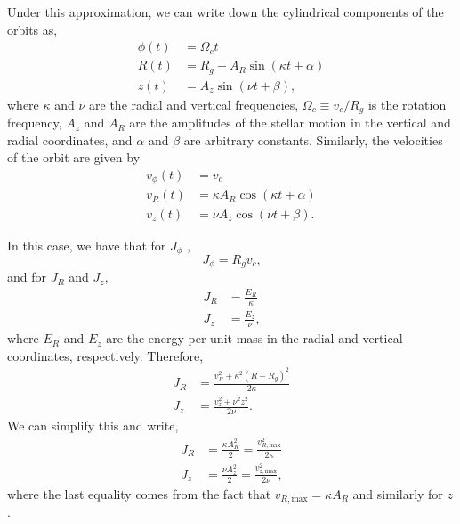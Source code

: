 \documentclass[twocolumn]{aastex62}
\newcommand{\beq}{\begin{equation}}
\newcommand{\eeq}{\end{equation}}
\begin{document}
Under this approximation, we can write down the cylindrical components
of the orbits as,
\beq\label{eq:orbits_epi}
\begin{split}
\phi(t) &= \Omega_c t \\
R(t) &= R_g + A_R \sin{(\kappa t + \alpha)} \\
z(t) &= A_z \sin{(\nu t + \beta)}
\text{,}
\end{split}
\eeq
where $\kappa$ and $\nu$ are the radial and vertical frequencies, $\Omega_c
\equiv v_c/R_g$ is the rotation frequency, $A_z$ and $A_R$ are the amplitudes of
the stellar motion in the vertical and radial coordinates, and $\alpha$ and
$\beta$ are arbitrary constants. Similarly, the velocities of the orbit are
given by
\beq\label{eq:orbits_vel_epi}
\begin{split}
v_{\phi}(t) &= v_c \\
v_R(t) &= \kappa A_R \cos{(\kappa t + \alpha)} \\
v_z(t) &= \nu A_z \cos{(\nu t + \beta)}
\text{.}
\end{split}
\eeq

In this case, we have that for $J_{\phi}$
\citep[][Section~3.5.3b]{2008gady.book.....B},
\beq\label{eq:Jphi_epi}
J_{\phi} = R_g v_c\text{,}
\eeq
and for $J_R$ and $J_z$,
\beq\label{eq:JR_Jz_epi}
\begin{split}
J_R &= \frac{E_R}{\kappa} \\
J_z &= \frac{E_z}{\nu} \text{,}
\end{split}
\eeq
where $E_R$ and $E_z$ are the energy per unit mass in the radial and vertical
coordinates, respectively. Therefore,
\beq\label{eq:JR_Jz_epi_energy}
\begin{split}
J_R &= \frac{v_R^2 + \kappa^2 (R-R_g)^2}{2\kappa} \\
J_z &= \frac{v_z^2 + \nu^2 z^2}{2\nu}\text{.}
\end{split}
\eeq
We can simplify this and write,
\beq\label{eq:JR_Jz_epi_final}
\begin{split}
J_R &= \frac{\kappa A_R^2}{2} = \frac{v_{R,\text{max}}^2}{2\kappa} \\
J_z &= \frac{\nu A_z^2}{2} = \frac{v_{z,\text{max}}^2}{2\nu}\text{,}
\end{split}
\eeq
where the last equality comes from the fact that $v_{R,\text{max}} = \kappa
A_R$ and similarly for $z$.
\end{document}
